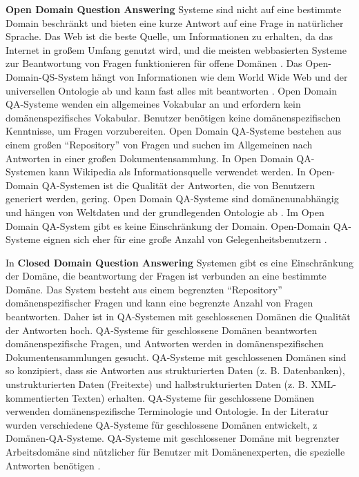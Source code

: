 \documentclass[
        ngerman,
        paper=a4,
        numbers=noendperiod,
]{scrreprt}
\begin{document}
\textbf{Open Domain Question Answering} Systeme sind nicht auf eine bestimmte Domain beschränkt und bieten eine kurze Antwort auf eine Frage in natürlicher Sprache. Das Web ist die beste Quelle, um Informationen zu erhalten, da das Internet in großem Umfang genutzt wird, und die meisten webbasierten Systeme zur Beantwortung von Fragen funktionieren für offene Domänen \citep{yogish2016survey}. Das Open-Domain-QS-System hängt von Informationen wie dem World Wide Web und der universellen Ontologie ab und kann fast alles mit beantworten \citep{SreelakshmiOPENLABELING}. Open Domain QA-Systeme wenden ein allgemeines Vokabular an und erfordern kein domänenspezifisches Vokabular. Benutzer benötigen keine domänenspezifischen Kenntnisse, um Fragen vorzubereiten. Open Domain QA-Systeme bestehen aus einem großen \enquote{Repository} von Fragen und suchen im Allgemeinen nach Antworten in einer großen Dokumentensammlung. In Open Domain QA-Systemen kann Wikipedia als Informationsquelle verwendet werden. In Open-Domain QA-Systemen ist die Qualität der Antworten, die von Benutzern generiert werden, gering. Open Domain QA-Systeme sind domänenunabhängig und hängen von Weltdaten und der grundlegenden Ontologie ab \citep{biswas2014framework}. Im Open Domain QA-System gibt es keine Einschränkung der Domain. Open-Domain QA-Systeme eignen sich eher für eine große Anzahl von Gelegenheitsbenutzern \citep[S. 20]{ChandraASystem}.

In \textbf{Closed Domain Question Answering} Systemen gibt es eine Einschränkung der Domäne, die beantwortung der Fragen ist verbunden an eine bestimmte Domäne. Das System besteht aus einem begrenzten \enquote{Repository} domänenspezifischer Fragen und kann eine begrenzte Anzahl von Fragen beantworten. Daher ist in QA-Systemen mit geschlossenen Domänen die Qualität der Antworten hoch. QA-Systeme für geschlossene Domänen beantworten domänenspezifische Fragen, und Antworten werden in domänenspezifischen Dokumentensammlungen gesucht. QA-Systeme mit geschlossenen Domänen sind so konzipiert, dass sie Antworten aus strukturierten Daten (z. B. Datenbanken), unstrukturierten Daten (Freitexte) und halbstrukturierten Daten (z. B. XML-kommentierten Texten) erhalten. QA-Systeme für geschlossene Domänen verwenden domänenspezifische Terminologie und Ontologie. In der Literatur wurden verschiedene QA-Systeme für geschlossene Domänen entwickelt, z Domänen-QA-Systeme. QA-Systeme mit geschlossener Domäne mit begrenzter Arbeitsdomäne sind nützlicher für Benutzer mit Domänenexperten, die spezielle Antworten benötigen \citep[S. 20]{ChandraASystem}.
\end{document}
